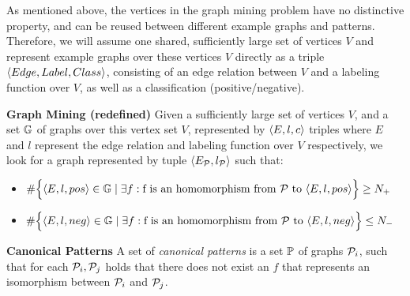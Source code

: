 
As mentioned above, the vertices in the graph mining problem have no distinctive property, and can be reused between different example graphs and patterns.
Therefore, we will assume one shared, sufficiently large set of vertices $V$ and represent example graphs over these vertices $V$ directly as a triple $\langle Edge, Label, Class \rangle$, consisting of an edge relation between $V$ and a labeling function over $V$, as well as a classification (positive/negative).

\begin{definition} \textbf{Graph Mining (redefined)}
\label{def:gm2}
Given a sufficiently large set of vertices $V$, and a set $\mathbb{G}$ of graphs over this vertex set $V$, represented by $\langle E, l, c \rangle$ triples
where $E$ and $l$ represent the edge relation and labeling function over $V$ respectively,
we look for a 
graph represented by tuple $\langle E_{\mathcal{P}}, l_{\mathcal{P}} \rangle$ such that:

\begin{itemize}
\item $\#\Big\lbrace \langle E,l,pos \rangle \in \mathbb{G} \; | \; \exists f : \text{f is an homomorphism from \ensuremath{\mathcal{P}} to \ensuremath{\langle E,l,pos \rangle}} \Big\rbrace \geq N_{+}$

\item $\#\Big\lbrace \langle E,l,neg \rangle \in \mathbb{G} \; | \; \exists f : \text{f is an homomorphism from \ensuremath{\mathcal{P}} to \ensuremath{\langle E,l,neg \rangle}} \Big\rbrace \leq N_{-}$
\end{itemize}
\end{definition}

\begin{definition} \textbf{Canonical Patterns}
A set of \emph{canonical patterns} is a set $\mathbb{P}$ of graphs $\mathcal{P}_{i}$, such that for each $\mathcal{P}_{i}, \mathcal{P}_{j}$ holds that there does not exist an $f$ that represents an isomorphism between $\mathcal{P}_{i}$ and $\mathcal{P}_{j}$.
\end{definition}

